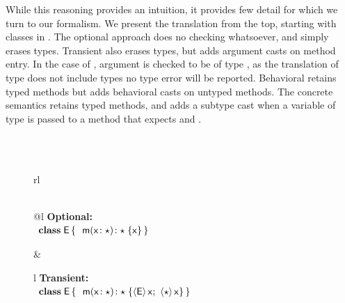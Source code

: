 \documentclass[USenglish]{tex/lipics-v2016}
\begin{document}
While this reasoning provides an intuition, it provides few detail for which
we turn to our formalism.  We present the translation from the top, starting
with classes in .  The optional approach does no
checking whatsoever, and simply erases types. Transient also erases types,
but adds argument casts on method entry. In the case of \m, argument \x is
checked to be of type \E, as the translation of type \E does not include
types no type error will be reported.  Behavioral retains typed methods but
adds behavioral casts on untyped methods.  The concrete semantics retains
typed methods, and adds a subtype cast when a variable of type \any is passed
to a method that expects and \E.

\begin{figure}[!h]\small
\hrulefill\\
\\
\begin{tabular}{rl}
\\[2mm]\\
\begin{tabular}{@{}l}
{\bf Optional:}\\[2mm]
\(\begin{array}{l@{\,}l}
\Class{\xt E}{}{&\Mdef\m\x{\any}{\any}\x } \\
\end{array}\) 
\end{tabular}&
\begin{tabular}{l}
{\bf Transient:}\\[2mm]
\(\begin{array}{l@{\,}l}
\Class{\xt E}{}{&\Mdef\m\x\any\any{\SubCast{\xt E}\x ; ~ \SubCast{\any}{\x}}} \\
\end{array}\)
\end{tabular}\\\\
\end{tabular}
\end{figure}
\end{document}
